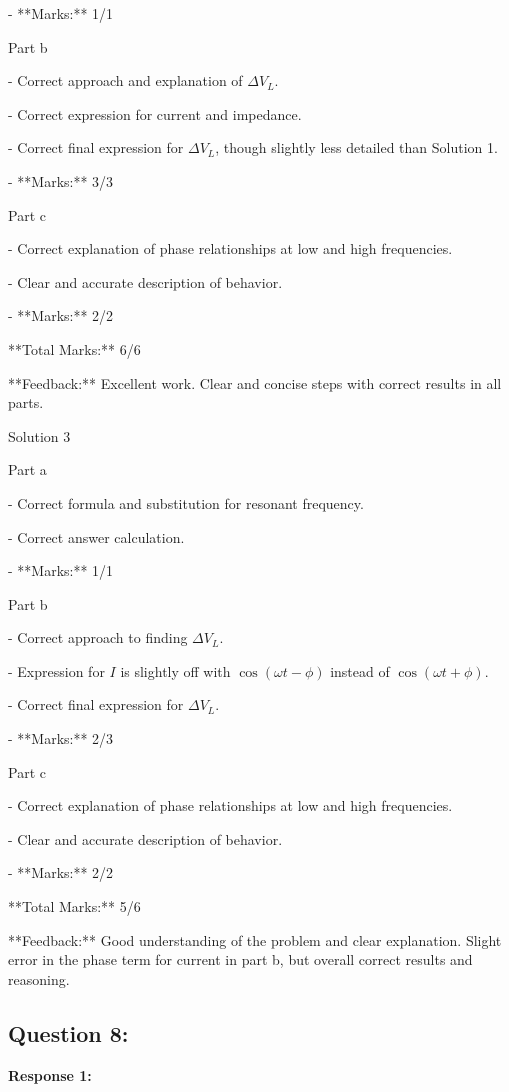 \documentclass[a4paper,11pt]{article}
\begin{document}
- **Marks:** 1/1

Part b

- Correct approach and explanation of \( \Delta V_{L} \).

- Correct expression for current and impedance.

- Correct final expression for \( \Delta V_{L} \), though slightly less detailed than Solution 1.

- **Marks:** 3/3

Part c

- Correct explanation of phase relationships at low and high frequencies.

- Clear and accurate description of behavior.

- **Marks:** 2/2

**Total Marks:** 6/6

**Feedback:** Excellent work. Clear and concise steps with correct results in all parts.

Solution 3

Part a

- Correct formula and substitution for resonant frequency.

- Correct answer calculation.

- **Marks:** 1/1

Part b

- Correct approach to finding \( \Delta V_{L} \).

- Expression for \( I \) is slightly off with \( \cos(\omega t - \phi) \) instead of \( \cos(\omega t + \phi) \).

- Correct final expression for \( \Delta V_{L} \).

- **Marks:** 2/3

Part c

- Correct explanation of phase relationships at low and high frequencies.

- Clear and accurate description of behavior.

- **Marks:** 2/2

**Total Marks:** 5/6

**Feedback:** Good understanding of the problem and clear explanation. Slight error in the phase term for current in part b, but overall correct results and reasoning.

\subsection*{Question 8:}

\textbf{Response 1:}
\end{document}
